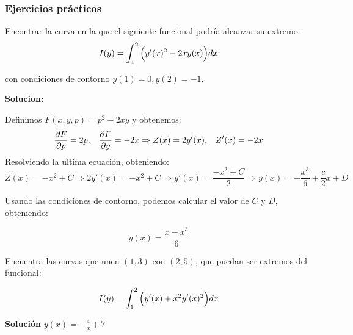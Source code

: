 \subsubsection{Ejercicios prácticos}

\begin{ejercicio}
Encontrar la curva en la que el siguiente funcional podría alcanzar su extremo:
\[
I(y)=\displaystyle\int_{ 1 }^{ 2 } \Big(y'(x)^2-2xy(x)\Big)dx
\]

con condiciones de contorno $y(1)=0,y(2)=-1$.
\end{ejercicio}

\textbf{Solucion:}

Definimos $F(x,y,p)=p^2-2xy$ y obtenemos:
\[
\frac{\partial F }{\partial p }=2p, \;\;\; \frac{\partial F }{\partial y }=-2x \Rightarrow Z(x)=2y'(x), \;\;\; Z'(x)=-2x
\]
Resolviendo la ultima ecuación, obteniendo:
\[
Z(x)=-x^2+C \Rightarrow 2y'(x)=-x^2+C \Rightarrow y'(x)=\frac{-x^2+C}{2}\Rightarrow y(x)=-\frac{x^3}{6}+\frac{c}{2}x+D
\]

Usando las condiciones de contorno, podemos calcular el valor de $C$ y $D$, obteniendo:

\[
y(x)=\frac{x-x^3}{6}
\]

\begin{ejercicio}[propuesto]
Encuentra las curvas que unen $(1,3)$ con $(2,5)$, que puedan ser extremos del funcional:

\[
I(y)=\displaystyle\int_{ 1 }^{ 2 } \Big(y'(x)+x^2y'(x)^2\Big)dx
\]
\end{ejercicio}

\textbf{Solución} $y(x)=-\frac{4}{x}+7$